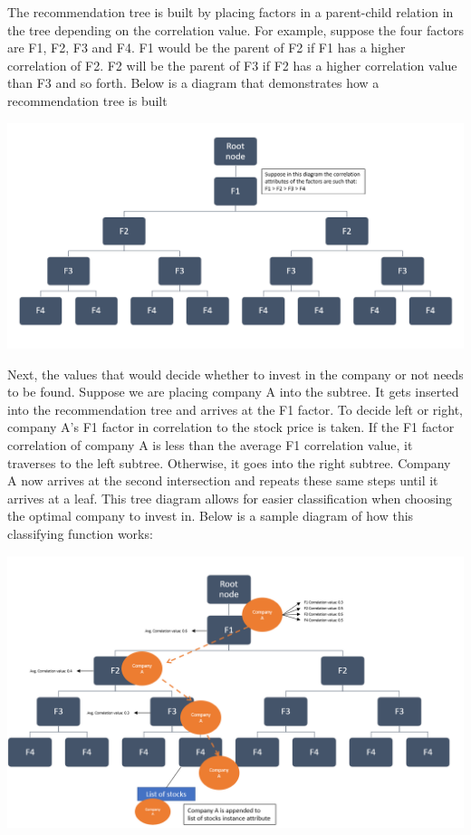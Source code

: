 \documentclass[fontsize=11pt]{article}
\begin{document}
The recommendation tree is built by placing factors in a parent-child relation in the tree depending on the correlation value. For example, suppose the four factors are F1, F2, F3 and F4. F1 would be the parent of F2 if F1 has a higher correlation of F2. F2 will be the parent of F3 if F2 has a higher correlation value than F3 and so forth. Below is a diagram that demonstrates how a recommendation tree is built\\

\begin{center}
\includegraphics[scale=0.75]{tree_diagram.png}
\end{center}

Next, the values that would decide whether to invest in the company or not needs to be found. Suppose we are placing company A into the subtree. It gets inserted into the recommendation tree and arrives at the F1 factor. 
To decide left or right, company A's F1 factor in correlation to the stock price is taken. If the F1 factor correlation of company A is less than the average F1 correlation value, it traverses to the left subtree. Otherwise, it goes into the right subtree. Company A now arrives at the second intersection and repeats these same steps until it arrives at a leaf. This tree diagram allows for easier classification when choosing the optimal company to invest in. Below is a sample diagram of how this classifying function works:
\begin{center}
\includegraphics[scale=0.75]{tree_traversal.png}
\end{center} 
\end{document}

